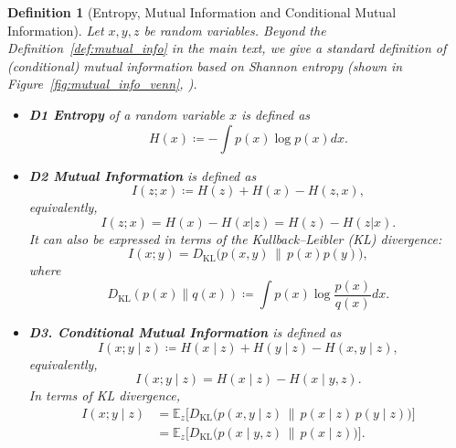 \documentclass{article} %
\newtheorem{definition}[theorem]{Definition}
\begin{document}
\begin{definition}[Entropy, Mutual Information and Conditional Mutual Information] \label{def:mutual_cond_mutual}
Let $x, y, z$ be random variables. Beyond the Definition~\ref{def:mutual_info} in the main text, we give a standard definition of (conditional) mutual information based on Shannon entropy (shown in Figure~\ref{fig:mutual_info_venn}, \citep{csiszar2004information}).

\begin{itemize}
    \item \textbf{D1 Entropy} of a random variable $x$ is defined as
    \[
        H(x) \coloneqq - \int p(x) \log p(x) dx.
    \]

    \item \textbf{D2 Mutual Information} is defined as
    \[
        I(z;x) \coloneqq H(z) + H(x) - H(z,x),
    \]
    equivalently,
    \[
        I(z;x) = H(x) - H(x|z) = H(z) - H(z|x).
    \]
    It can also be expressed in terms of the Kullback--Leibler (KL) divergence:
    \[
        I(x;y) = D_{\mathrm{KL}}\!\big( p(x,y) \,\big\|\, p(x)p(y) \big),
    \]
    where
    \[
        D_{\mathrm{KL}}(p(x) \| q(x)) \coloneqq \int p(x) \log \frac{p(x)}{q(x)} dx.
    \]

    \item \textbf{D3. Conditional Mutual Information} is defined as
    \[
        I(x;y \mid z) \coloneqq H(x \mid z) + H(y \mid z) - H(x,y \mid z),
    \]
    equivalently,
    \[
        I(x;y \mid z) = H(x \mid z) - H(x \mid y,z).
    \]
    In terms of KL divergence,
    \begin{align*}
                I(x;y \mid z) & = \mathbb{E}_z \Big[ D_{\mathrm{KL}}\!\big( p(x,y \mid z) \,\big\|\, p(x \mid z)\,p(y \mid z) \big) \Big] \\
                & = \mathbb{E}_z \Big[ D_{\mathrm{KL}}\!\big( p(x \mid y, z) \,\big\|\, p(x \mid z) \big) \Big].
    \end{align*}
\end{itemize}
\end{definition}





\clearpage
\end{document}

